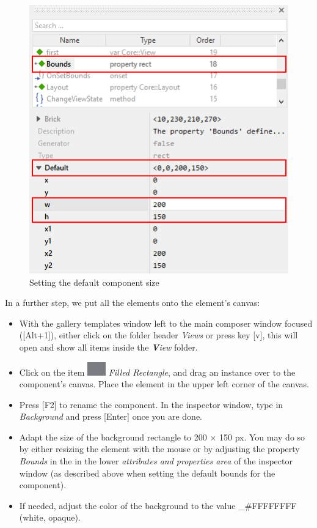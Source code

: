 \documentclass[
  a4paper,
,tablecaptionabove
]{scrbook}
\begin{document}
\begin{figure}
\centering
\includegraphics{./../asciidoc/modules/ROOT/assets/images/firstcomponent/ComponentBounds.png}
\caption{Setting the default component size}
\end{figure}

In a further step, we put all the elements onto the element's canvas:

\begin{itemize}
\item
  With the gallery templates window left to the main composer window
  focused ({[}Alt+1{]}), either click on the folder header
  \emph{Views} or press key {[}v{]}, this will open and show all
  items inside the \emph{\textbf{V}iew} folder.
\item
  Click on the item
  \includegraphics{./../asciidoc/modules/ROOT/assets/images/icons/FilledRectangleIcon.png}
  \emph{Filled Rectangle}, and drag an instance over to the component's
  canvas. Place the element in the upper left corner of the canvas.
\item
  Press {[}F2{]} to rename the component. In the inspector window,
  type in \emph{Background} and press {[}Enter{]} once you are done.
\item
  Adapt the size of the background rectangle to 200 × 150 px. You may do
  so by either resizing the element with the mouse or by adjusting the
  property \emph{Bounds} in the in the lower \emph{attributes and
  properties area} of the inspector window (as described above when
  setting the default bounds for the component).
\item
  If needed, adjust the color of the background to the value
  \_\#FFFFFFFF (white, opaque).
\end{itemize}
\end{document}
